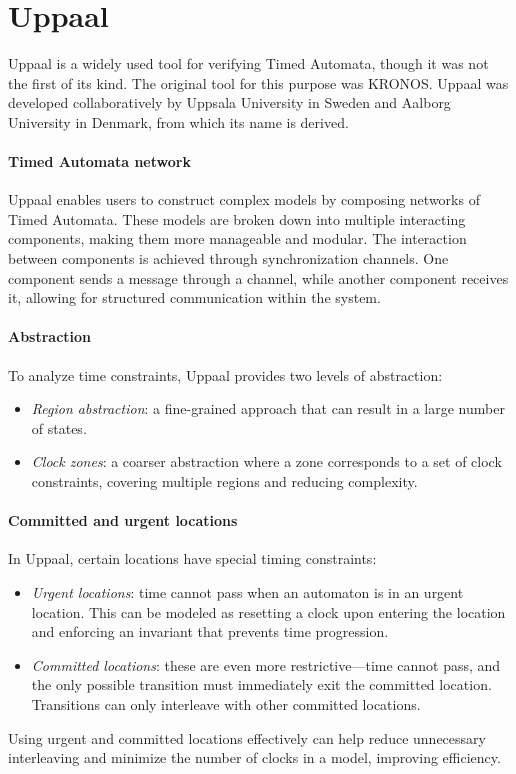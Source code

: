\section{Uppaal}

Uppaal is a widely used tool for verifying Timed Automata, though it was not the first of its kind. 
The original tool for this purpose was KRONOS.
Uppaal was developed collaboratively by Uppsala University in Sweden and Aalborg University in Denmark, from which its name is derived. 

\paragraph*{Timed Automata network}
Uppaal enables users to construct complex models by composing networks of Timed Automata. 
These models are broken down into multiple interacting components, making them more manageable and modular.
The interaction between components is achieved through synchronization channels. 
One component sends a message through a channel, while another component receives it, allowing for structured communication within the system.

\paragraph*{Abstraction}
To analyze time constraints, Uppaal provides two levels of abstraction:
\begin{itemize}
    \item \textit{Region abstraction}: a fine-grained approach that can result in a large number of states.
    \item \textit{Clock zones}: a coarser abstraction where a zone corresponds to a set of clock constraints, covering multiple regions and reducing complexity.
\end{itemize}

\paragraph*{Committed and urgent locations}
In Uppaal, certain locations have special timing constraints:
\begin{itemize}
    \item \textit{Urgent locations}: time cannot pass when an automaton is in an urgent location. 
        This can be modeled as resetting a clock upon entering the location and enforcing an invariant that prevents time progression.
    \item \textit{Committed locations}: these are even more restrictive—time cannot pass, and the only possible transition must immediately exit the committed location. 
        Transitions can only interleave with other committed locations.
\end{itemize}
\noindent Using urgent and committed locations effectively can help reduce unnecessary interleaving and minimize the number of clocks in a model, improving efficiency.

